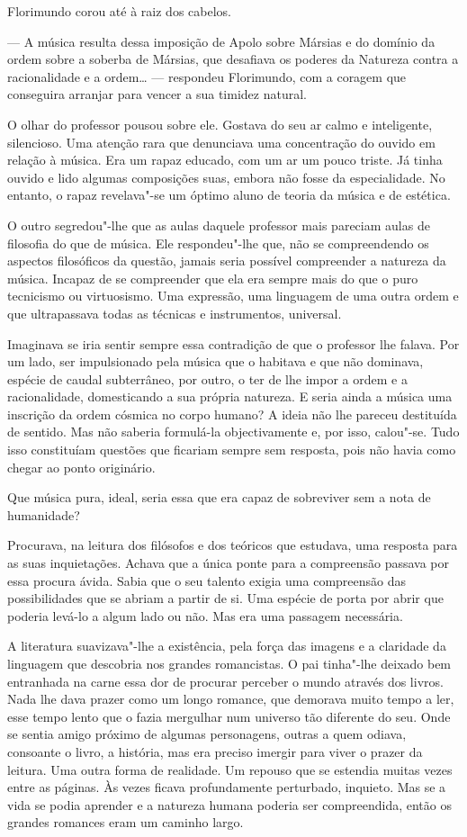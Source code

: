 Florimundo corou até à raiz dos cabelos.

--- A música resulta dessa imposição de Apolo sobre Mársias e do domínio
da ordem sobre a soberba de Mársias, que desafiava os poderes da
Natureza contra a racionalidade e a ordem\ldots{} --- respondeu Florimundo, com
a coragem que conseguira arranjar para vencer a sua timidez natural.

O olhar do professor pousou sobre ele. Gostava do seu ar calmo e
inteligente, silencioso. Uma atenção rara que denunciava uma
concentração do ouvido em relação à música. Era um rapaz educado, com um
ar um pouco triste. Já tinha ouvido e lido algumas composições suas,
embora não fosse da especialidade. No entanto, o rapaz revelava"-se um
óptimo aluno de teoria da música e de estética.

O outro segredou"-lhe que as aulas daquele professor mais pareciam aulas
de filosofia do que de música. Ele respondeu"-lhe que, não se
compreendendo os aspectos filosóficos da questão, jamais seria possível
compreender a natureza da música. Incapaz de se compreender que ela era
sempre mais do que o puro tecnicismo ou virtuosismo. Uma expressão, uma
linguagem de uma outra ordem e que ultrapassava todas as técnicas e
instrumentos, universal.

Imaginava se iria sentir sempre essa contradição de que o professor lhe
falava. Por um lado, ser impulsionado pela música que o habitava e que
não dominava, espécie de caudal subterrâneo, por outro, o ter de lhe
impor a ordem e a racionalidade, domesticando a sua própria natureza. E
seria ainda a música uma inscrição da ordem cósmica no corpo humano? A
ideia não lhe pareceu destituída de sentido. Mas não saberia formulá-la
objectivamente e, por isso, calou"-se. Tudo isso constituíam questões que
ficariam sempre sem resposta, pois não havia como chegar ao ponto
originário.

Que música pura, ideal, seria essa que era capaz de sobreviver sem a
nota de humanidade?

Procurava, na leitura dos filósofos e dos teóricos que estudava, uma
resposta para as suas inquietações. Achava que a única ponte para a
compreensão passava por essa procura ávida. Sabia que o seu talento
exigia uma compreensão das possibilidades que se abriam a partir de si.
Uma espécie de porta por abrir que poderia levá-lo a algum lado ou não.
Mas era uma passagem necessária.

A literatura suavizava"-lhe a existência, pela força das imagens e a
claridade da linguagem que descobria nos grandes romancistas. O pai
tinha"-lhe deixado bem entranhada na carne essa dor de procurar perceber
o mundo através dos livros. Nada lhe dava prazer como um longo romance,
que demorava muito tempo a ler, esse tempo lento que o fazia mergulhar
num universo tão diferente do seu. Onde se sentia amigo próximo de
algumas personagens, outras a quem odiava, consoante o livro, a
história, mas era preciso imergir para viver o prazer da leitura. Uma
outra forma de realidade. Um repouso que se estendia muitas vezes entre
as páginas. Às vezes ficava profundamente perturbado, inquieto. Mas se a
vida se podia aprender e a natureza humana poderia ser compreendida,
então os grandes romances eram um caminho largo.

